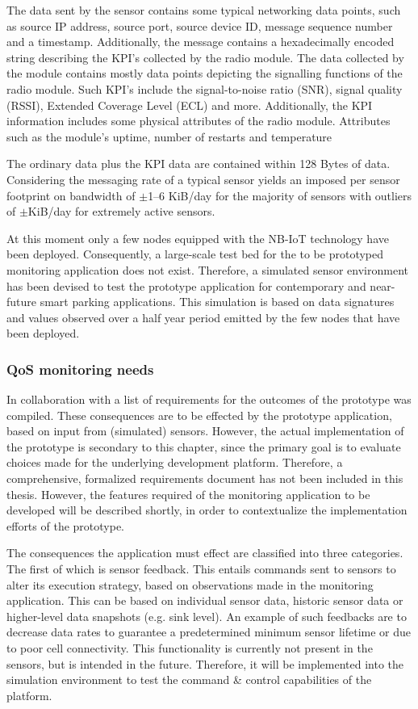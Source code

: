 The data sent by the sensor contains some typical networking data points, such as source IP address, source port, source device ID, message sequence number and a timestamp. Additionally, the message contains a hexadecimally encoded string describing the KPI's collected by the \ublox radio module. The data collected by the \ublox module contains mostly data points depicting the signalling functions of the radio module. Such KPI's include the signal-to-noise ratio (SNR), signal quality (RSSI), Extended Coverage Level (ECL) and more. Additionally, the KPI information includes some physical attributes of the radio module. Attributes such as the module's uptime, number of restarts and temperature

The ordinary data plus the \ublox KPI data are contained within 128 Bytes of data. Considering the messaging rate of a typical sensor yields an imposed per sensor footprint on bandwidth of $\pm$1--6 KiB/day for the majority of sensors with outliers of $\pm$KiB/day for extremely active sensors.

At this moment only a few nodes equipped with the NB-IoT technology have been deployed. Consequently, a large-scale test bed for the to be prototyped monitoring application does not exist. Therefore, a simulated sensor environment has been devised to test the prototype application for contemporary and near-future smart parking applications. This simulation is based on data signatures and values observed over a half year period emitted by the few nodes that have been deployed.

\subsubsection{QoS monitoring needs}
In collaboration with \nedap\idsystems a list of requirements for the outcomes of the prototype was compiled. These consequences are to be effected by the prototype application, based on input from (simulated) sensors. However, the actual implementation of the prototype is secondary to this chapter, since the primary goal is to evaluate choices made for the underlying development platform. Therefore, a comprehensive, formalized requirements document has not been included in this thesis. However, the features required of the monitoring application to be developed will be described shortly, in order to contextualize the implementation efforts of the prototype.

The consequences the application must effect are classified into three categories. The first of which is sensor feedback. This entails commands sent to sensors to alter its execution strategy, based on observations made in the monitoring application. This can be based on individual sensor data, historic sensor data or higher-level data snapshots (e.g. sink level). An example of such feedbacks are to decrease data rates to guarantee a predetermined minimum sensor lifetime or due to poor cell connectivity. This functionality is currently not present in the \nedap sensors, but is intended in the future. Therefore, it will be implemented into the simulation environment to test the command \& control capabilities of the platform.

